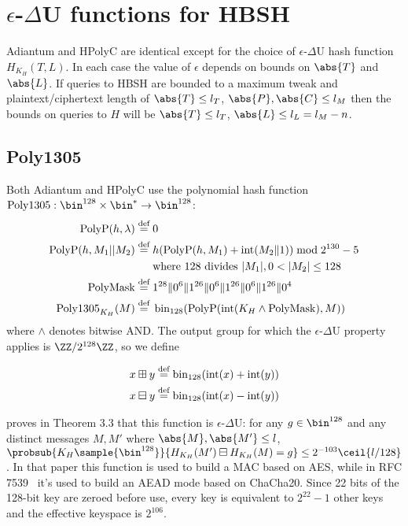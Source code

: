 \documentclass[eprint.tex]{subfiles}
\begin{document}
\section{\texorpdfstring{$\epsilon$-$\Delta$U}{𝜖-∆U} functions for HBSH}\label{hashing}

Adiantum and HPolyC are identical except for the choice of $\epsilon$-$\Delta$U hash function
$H_{K_H}(T, L)$. In each case the value of $\epsilon$ depends on bounds on $\abs{T}$ and $\abs{L}$.
If queries to HBSH are bounded to a maximum tweak and plaintext/ciphertext length of
$\abs{T} \leq l_T$, $\abs{P}, \abs{C} \leq l_M$
then the bounds on queries to $H$ will be $\abs{T} \leq l_T$, $\abs{L} \leq l_L = l_M - n$.

\subsection{Poly1305}
Both Adiantum and HPolyC use the polynomial hash function
$\Polydjb: \bin^{128} \times \bin^* \rightarrow \bin^{128}$:
\begin{align*}
    \operatorname{PolyP}(h, \lambda) \stackrel{\text{def}}{=}{}& 0 \\
    \operatorname{PolyP}(h, M_1||M_2) \stackrel{\text{def}}{=}{}& h(\operatorname{PolyP}(h, M_1) + \operatorname{int}(M_2 \Vert 1))  \bmod 2^{130}-5 \\
    &\textrm{where} \ 128 \ \textrm{divides} \  |M_1|, 0 < |M_2| \leq 128 \\
    \operatorname{PolyMask} \stackrel{\text{def}}{=}{}&  1^{28} \Vert 0^6 \Vert 1^{26} \Vert 0^6 \Vert 1^{26} \Vert 0^6 \Vert 1^{26} \Vert 0^{4} \\
    \operatorname{Poly1305}_{K_H}(M) \stackrel{\text{def}}{=}{}& \operatorname{bin}_{128}(\operatorname{PolyP}(\operatorname{int}(K_H \land \operatorname{PolyMask}),  M)) \\
\end{align*}
where $\land$ denotes bitwise AND. The output group for which the $\epsilon$-$\Delta$U property applies is
$\ZZ/2^{128}\ZZ$, so we define

\begin{align*}
    x \boxplus y &\stackrel{\text{def}}{=} \operatorname{bin}_{128}(\operatorname{int}(x) + \operatorname{int}(y)) \\
    x \boxminus y &\stackrel{\text{def}}{=} \operatorname{bin}_{128}(\operatorname{int}(x) - \operatorname{int}(y)) \\
\end{align*}

\cite{poly1305} proves in Theorem 3.3 that this function is $\epsilon$-$\Delta$U: for any
$g \in \bin^{128}$ and any distinct messages $M, M'$ where $\abs{M}, \abs{M'} \leq l$,
$\probsub{K_H \sample{\bin^{128}}}{H_{K_H}(M') \boxminus H_{K_H}(M) = g} \leq 2^{-103}\ceil{l/128}$.
In that paper this function is used to build a MAC based on AES, while in
RFC 7539~\cite{RFC7539} it's used to build an AEAD mode based on ChaCha20.
Since 22 bits of the 128-bit key are zeroed before use, every key is equivalent to
$2^{22} - 1$ other keys and the effective keyspace is $2^{106}$.
\end{document}
